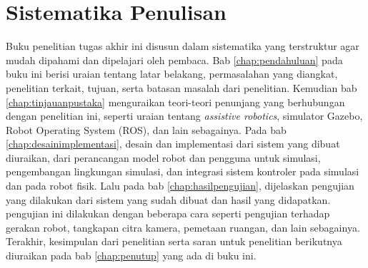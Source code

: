 \section{Sistematika Penulisan}
\label{sec:sistematikapenulisan}

Buku penelitian tugas akhir ini disusun dalam sistematika yang terstruktur agar mudah dipahami dan dipelajari oleh pembaca.
Bab \ref{chap:pendahuluan} pada buku ini berisi uraian tentang latar belakang, permasalahan yang diangkat, penelitian terkait, tujuan, serta batasan masalah dari penelitian.
Kemudian bab \ref{chap:tinjauanpustaka} menguraikan teori-teori penunjang yang berhubungan dengan penelitian ini,
  seperti uraian tentang \emph{assistive robotics}, simulator Gazebo, Robot Operating System (ROS),
  dan lain sebagainya.
Pada bab \ref{chap:desainimplementasi}, desain dan implementasi dari sistem yang dibuat diuraikan,
  dari perancangan model robot dan pengguna untuk simulasi, pengembangan lingkungan simulasi,
  dan integrasi sistem kontroler pada simulasi dan pada robot fisik.
Lalu pada bab \ref{chap:hasilpengujian}, dijelaskan pengujian yang dilakukan dari sistem yang sudah dibuat dan hasil yang didapatkan.
pengujian ini dilakukan dengan beberapa cara seperti pengujian terhadap gerakan robot,
  tangkapan citra kamera, pemetaan ruangan, dan lain sebagainya.
Terakhir, kesimpulan dari penelitian serta saran untuk penelitian berikutnya diuraikan pada bab \ref{chap:penutup} yang ada di buku ini.
